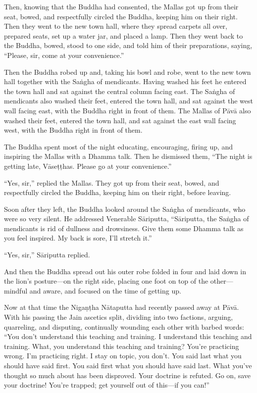 \documentclass[12pt,openany]{book}%
\begin{document}
Then, knowing that the Buddha had consented, the Mallas got up from their seat, bowed, and respectfully circled the Buddha, keeping him on their right. Then they went to the new town hall, where they spread carpets all over, prepared seats, set up a water jar, and placed a lamp. Then they went back to the Buddha, bowed, stood to one side, and told him of their preparations, saying, “Please, sir, come at your convenience.” 

Then the Buddha robed up and, taking his bowl and robe, went to the new town hall together with the \textsanskrit{Saṅgha} of mendicants. Having washed his feet he entered the town hall and sat against the central column facing east. The \textsanskrit{Saṅgha} of mendicants also washed their feet, entered the town hall, and sat against the west wall facing east, with the Buddha right in front of them. The Mallas of \textsanskrit{Pāvā} also washed their feet, entered the town hall, and sat against the east wall facing west, with the Buddha right in front of them. 

The Buddha spent most of the night educating, encouraging, firing up, and inspiring the Mallas with a Dhamma talk. Then he dismissed them, “The night is getting late, \textsanskrit{Vāseṭṭhas}. Please go at your convenience.” 

“Yes, sir,” replied the Mallas. They got up from their seat, bowed, and respectfully circled the Buddha, keeping him on their right, before leaving. 

Soon after they left, the Buddha looked around the \textsanskrit{Saṅgha} of mendicants, who were so very silent. He addressed Venerable \textsanskrit{Sāriputta}, “\textsanskrit{Sāriputta}, the \textsanskrit{Saṅgha} of mendicants is rid of dullness and drowsiness. Give them some Dhamma talk as you feel inspired. My back is sore, I’ll stretch it.” 

“Yes, sir,” \textsanskrit{Sāriputta} replied. 

And then the Buddha spread out his outer robe folded in four and laid down in the lion’s posture—on the right side, placing one foot on top of the other—mindful and aware, and focused on the time of getting up. 

Now at that time the \textsanskrit{Nigaṇṭha} \textsanskrit{Nātaputta} had recently passed away at \textsanskrit{Pāvā}. With his passing the Jain ascetics split, dividing into two factions, arguing, quarreling, and disputing, continually wounding each other with barbed words: “You don’t understand this teaching and training. I understand this teaching and training. What, you understand this teaching and training? You’re practicing wrong. I’m practicing right. I stay on topic, you don’t. You said last what you should have said first. You said first what you should have said last. What you’ve thought so much about has been disproved. Your doctrine is refuted. Go on, save your doctrine! You’re trapped; get yourself out of this—if you can!” 
\end{document}
